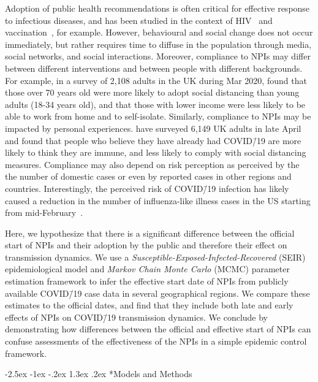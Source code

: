 \documentclass[12pt]{extarticle}
\makeatletter
\renewcommand\section{\@startsection {section}{1}{\z@}%
     {-2.5ex \@plus -1ex \@minus -.2ex}%
     {1.3ex \@plus.2ex}%
    {\Large\bfseries}}
\newcommand{\covid}{COVID\=/19 }
\makeatother
\begin{document}
Adoption of public health recommendations is often critical for effective response to infectious diseases, and has been studied in the context of HIV~\citep{Kaufman2014} and vaccination~\citep{Dunn2015,Wiyeh2018}, for example.
However, behavioural and social change does not occur immediately, but rather requires time to diffuse in the population through media, social networks, and social interactions. 
Moreover, compliance to NPIs may differ between different interventions and between people with different backgrounds.
For example, in a survey of 2,108 adults in the UK during Mar 2020, \citet{Atchison2020} found that those over 70 years old were more likely to adopt social distancing than young adults (18-34 years old), and that those with lower income were less likely to be able to work from home and to self-isolate.
Similarly, compliance to NPIs may be impacted by personal experiences. \citet{Smith2020} have surveyed 6,149 UK adults in late April and found that people who believe they have already had \covid are more likely to think they are immune, and less likely to comply with social distancing measures. 
Compliance may also depend on risk perception as perceived by the the number of domestic cases or even by reported cases in other regions and countries.
Interestingly, the perceived risk of \covid infection has likely caused a reduction in the number of influenza-like illness cases in the US starting from mid-February~\citep{Zipfel2020}.

Here, we hypothesize that there is a significant difference between the official start of NPIs and their adoption by the public and therefore their effect on transmission dynamics.
We use a \textit{Susceptible-Exposed-Infected-Recovered} (SEIR) epidemiological model and \textit{Markov Chain Monte Carlo} (MCMC) parameter estimation framework to infer the effective start date of NPIs from publicly available \covid case data in several geographical regions.
We compare these estimates to the official dates, and find that they include both late and early effects of NPIs on \covid transmission dynamics.
We conclude by demonstrating how differences between the official and effective start of NPIs can confuse assessments of the effectiveness of the NPIs in a simple epidemic control framework.



\section*{Models and Methods}
\end{document}
